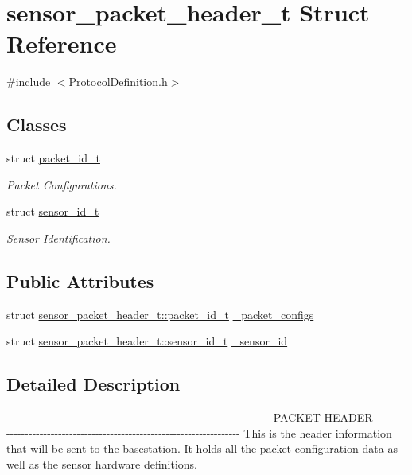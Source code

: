 \hypertarget{structsensor__packet__header__t}{\section{sensor\-\_\-packet\-\_\-header\-\_\-t \-Struct \-Reference}
\label{structsensor__packet__header__t}
}


{\ttfamily \#include $<$\-Protocol\-Definition.\-h$>$}

\subsection*{\-Classes}
\begin{DoxyCompactItemize}
\item 
struct \hyperlink{structsensor__packet__header__t_1_1packet__id__t}{packet\-\_\-id\-\_\-t}
\begin{DoxyCompactList}\small\item\em \-Packet \-Configurations. \end{DoxyCompactList}\item 
struct \hyperlink{structsensor__packet__header__t_1_1sensor__id__t}{sensor\-\_\-id\-\_\-t}
\begin{DoxyCompactList}\small\item\em \-Sensor \-Identification. \end{DoxyCompactList}\end{DoxyCompactItemize}
\subsection*{\-Public \-Attributes}
\begin{DoxyCompactItemize}
\item 
struct \*
\hyperlink{structsensor__packet__header__t_1_1packet__id__t}{sensor\-\_\-packet\-\_\-header\-\_\-t\-::packet\-\_\-id\-\_\-t} \hyperlink{structsensor__packet__header__t_a4e5e38459edaa1955085958204b2ccfa}{\-\_\-packet\-\_\-configs}
\item 
struct \*
\hyperlink{structsensor__packet__header__t_1_1sensor__id__t}{sensor\-\_\-packet\-\_\-header\-\_\-t\-::sensor\-\_\-id\-\_\-t} \hyperlink{structsensor__packet__header__t_afcdc03dc84384733134e6334eb9aad2b}{\-\_\-sensor\-\_\-id}
\end{DoxyCompactItemize}


\subsection{\-Detailed \-Description}
-\/-\/-\/-\/-\/-\/-\/-\/-\/-\/-\/-\/-\/-\/-\/-\/-\/-\/-\/-\/-\/-\/-\/-\/-\/-\/-\/-\/-\/-\/-\/-\/-\/-\/-\/-\/-\/-\/-\/-\/-\/-\/-\/-\/-\/-\/-\/-\/-\/-\/-\/-\/-\/-\/-\/-\/-\/-\/-\/-\/-\/-\/-\/-\/-\/-\/-\/-\/-\/-\/-\/ \-P\-A\-C\-K\-E\-T \-H\-E\-A\-D\-E\-R -\/-\/-\/-\/-\/-\/-\/-\/-\/-\/-\/-\/-\/-\/-\/-\/-\/-\/-\/-\/-\/-\/-\/-\/-\/-\/-\/-\/-\/-\/-\/-\/-\/-\/-\/-\/-\/-\/-\/-\/-\/-\/-\/-\/-\/-\/-\/-\/-\/-\/-\/-\/-\/-\/-\/-\/-\/-\/-\/-\/-\/-\/-\/-\/-\/-\/-\/-\/-\/-\/-\/ \-This is the header information that will be sent to the basestation. \-It holds all the packet configuration data as well as the sensor hardware definitions. 

